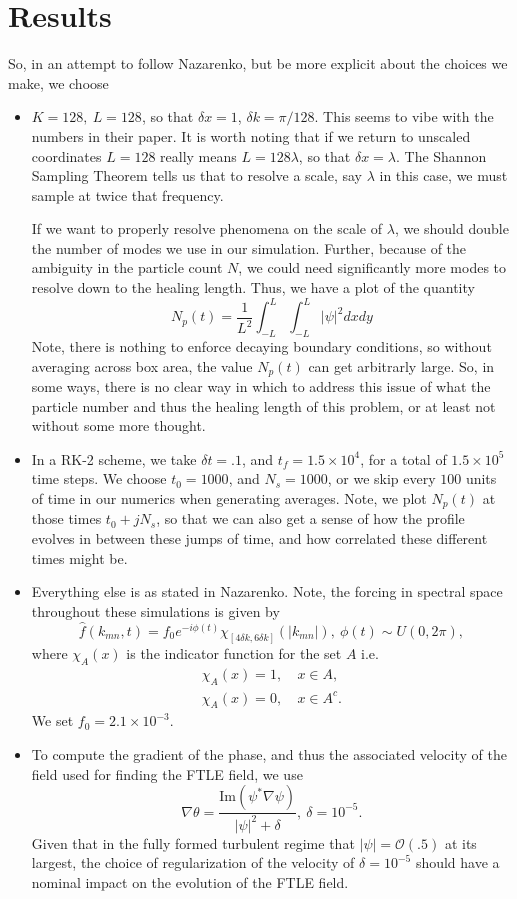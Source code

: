 \documentclass[a4paper,11pt]{article}
\begin{document}
\section*{Results}
So, in an attempt to follow Nazarenko, but be more explicit about the choices we make, we choose 
\begin{itemize}
\item $K = 128, ~ L = 128$, so that $\delta x = 1$, $\delta k = \pi/128$.  This seems to vibe with the numbers in their paper.  It is worth noting that if we return to unscaled coordinates $L=128$ really means $L=128\lambda$, so that $\delta x = \lambda$.  The Shannon Sampling Theorem tells us that to resolve a scale, say $\lambda$ in this case, we must sample at twice that frequency.  

If we want to properly resolve phenomena on the scale of $\lambda$, we should double the number of modes we use in our simulation.  Further, because of the ambiguity in the particle count $N$, we could need significantly more modes to resolve down to the healing length.  Thus, we have a plot of the quantity
\[
N_{p}(t) = \frac{1}{L^{2}}\int_{-L}^{L}\int_{-L}^{L} \left|\psi \right|^{2} dx dy
\]
Note, there is nothing to enforce decaying boundary conditions, so without averaging across box area, the value $N_{p}(t)$ can get arbitrarly large.  So, in some ways, there is no clear way in which to address this issue of what the particle number and thus the healing length of this problem, or at least not without some more thought.  

\item In a RK-2 scheme, we take $\delta t = .1$, and $t_{f}=1.5\times 10^{4}$, for a total of $1.5\times 10^{5}$ time steps.  We choose $t_{0}=1000$, and $N_{s}=1000$, or we skip every $100$ units of time in our numerics when generating averages.  Note, we plot $N_{p}(t)$ at those times $t_{0}+jN_{s}$, so that we can also get a sense of how the profile evolves in between these jumps of time, and how correlated these different times might be. 

\item Everything else is as stated in Nazarenko.  Note, the forcing in spectral space throughout these simulations is given by 
\[
\hat{f}(k_{mn},t) = f_{0}e^{-i\phi(t)}\chi_{[4\delta k , 6\delta k]}(|k_{mn}|), ~ \phi(t) \sim U(0,2\pi),
\]
where $\chi_{A}(x)$ is the indicator function for the set $A$ i.e. 
\begin{align*}
\chi_{A}(x)=1, & ~x\in A,\\
\chi_{A}(x)=0, & ~x\in A^{c}.
\end{align*}
We set $f_{0}=2.1\times 10^{-3}$.  
\item To compute the gradient of the phase, and thus the associated velocity of the field used for finding the FTLE field, we use 
\[
\nabla \theta = \frac{\mbox{Im}\left(\psi^{\ast}\nabla \psi\right)}{\left|\psi\right|^{2} + \delta}, ~ \delta = 10^{-5}.
\]
Given that in the fully formed turbulent regime that $|\psi|=\mathcal{O}(.5)$ at its largest, the choice of regularization of the velocity of $\delta=10^{-5}$ should have a nominal impact on the evolution of the FTLE field.
\end{itemize}
\end{document}
